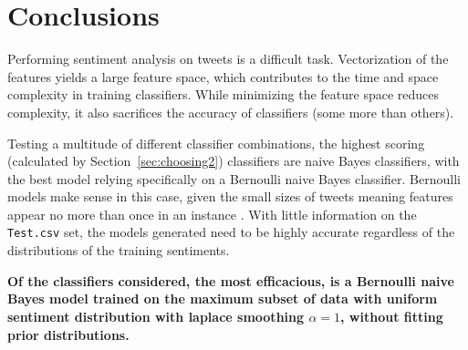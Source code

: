 \documentclass[11pt]{article}
\begin{document}
\section{Conclusions}
Performing sentiment analysis on tweets is a difficult task.
Vectorization of the features yields a large feature space, which contributes to the time and space complexity in training classifiers.
While minimizing the feature space reduces complexity, it also sacrifices the accuracy of classifiers (some more than others).

Testing a multitude of different classifier combinations, the highest scoring (calculated by Section~\ref{sec:choosing2}) classifiers are naive Bayes classifiers, 
with the best model relying specifically on a Bernoulli naive Bayes classifier.
Bernoulli models make sense in this case, given the small sizes of tweets meaning features appear no more than once in an instance \cite{tweetlen}.
With little information on the \texttt{Test.csv} set, 
the models generated need to be highly accurate regardless of the distributions of the training sentiments.

\textbf{Of the classifiers considered, the most efficacious, 
is a Bernoulli naive Bayes model trained on the maximum subset of data with uniform sentiment distribution with laplace smoothing $\alpha = 1$, 
without fitting prior distributions.}

\pagebreak




\end{document}
